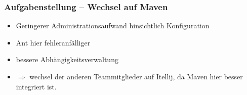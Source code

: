 \begin{frame}
\frametitle{Aufgabenstellung -- Wechsel auf Maven}
\begin{block}{\vspace*{-3ex}}
	\begin{itemize}
		\item Geringerer Administrationsaufwand hinsichtlich Konfiguration
		\item Ant hier fehleranfälliger
		\item bessere Abhängigkeitsverwaltung
		\item $\Rightarrow$ wechsel der anderen Teammitglieder auf Itellij, da Maven hier besser integriert ist.
	\end{itemize}
\end{block}
\end{frame}